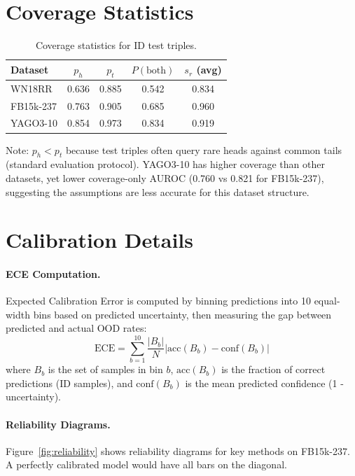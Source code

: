\section{Coverage Statistics}
\label{app:coverage}

\begin{table}[h]
\centering
\caption{Coverage statistics for ID test triples.}
\begin{tabular}{lcccc}
\toprule
Dataset & $p_h$ & $p_t$ & $P(\text{both})$ & $s_r$ (avg) \\
\midrule
WN18RR & 0.636 & 0.885 & 0.542 & 0.834 \\
FB15k-237 & 0.763 & 0.905 & 0.685 & 0.960 \\
YAGO3-10 & 0.854 & 0.973 & 0.834 & 0.919 \\
\bottomrule
\end{tabular}
\end{table}

Note: $p_h < p_t$ because test triples often query rare heads against common tails (standard evaluation protocol).
YAGO3-10 has higher coverage than other datasets, yet lower coverage-only AUROC (0.760 vs 0.821 for FB15k-237), suggesting the assumptions are less accurate for this dataset structure.

\section{Calibration Details}
\label{app:calibration}

\paragraph{ECE Computation.}
Expected Calibration Error is computed by binning predictions into 10 equal-width bins based on predicted uncertainty, then measuring the gap between predicted and actual OOD rates:
\begin{equation}
    \text{ECE} = \sum_{b=1}^{10} \frac{|B_b|}{N} \left| \text{acc}(B_b) - \text{conf}(B_b) \right|
\end{equation}
where $B_b$ is the set of samples in bin $b$, $\text{acc}(B_b)$ is the fraction of correct predictions (ID samples), and $\text{conf}(B_b)$ is the mean predicted confidence (1 - uncertainty).

\paragraph{Reliability Diagrams.}
Figure~\ref{fig:reliability} shows reliability diagrams for key methods on FB15k-237.
A perfectly calibrated model would have all bars on the diagonal.

